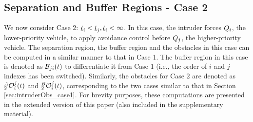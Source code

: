 \subsection{Separation and Buffer Regions - Case 2} \label{sec:case2_maintext}
We now consider Case 2: $\underline{t}_i < \underline{t}_j, \underline{t}_i <\infty$. In this case, the intruder forces $Q_i$, the lower-priority vehicle, to apply avoidance control before $Q_j$, the higher-priority vehicle. 
The separation region, the buffer region and the obstacles in this case can be computed in a similar manner to that in Case 1.
The buffer region in this case is denoted as $\mathcal{B}_{ji}(t)$ to differentiate it from Case 1 (i.e., the order of $i$ and $j$ indexes has been switched). 
Similarly, the obstacles for Case 2 are denoted as $_2^A\mathcal{O}_i^j(t)$ and $_2^B\mathcal{O}_i^j(t)$, corresponding to the two cases similar to that in Section \eqref{sec:intruderObs_case1}. 
For brevity purposes, these computations are presented in the extended version of this paper \cite{current_axriv} (also included in the supplementary material). 
